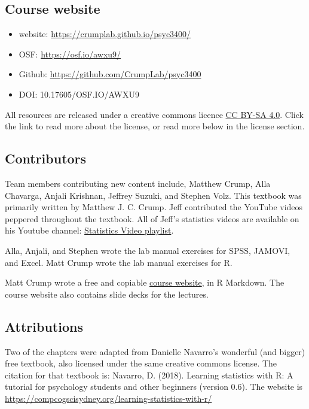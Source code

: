 \documentclass[]{book}
\providecommand{\tightlist}{%
  \setlength{\itemsep}{0pt}\setlength{\parskip}{0pt}}
\begin{document}
\hypertarget{course-website}{%
\subsection{Course website}\label{course-website}}

\begin{itemize}
\tightlist
\item
  website: \url{https://crumplab.github.io/psyc3400/}
\item
  OSF: \url{https://osf.io/awxu9/}
\item
  Github: \url{https://github.com/CrumpLab/psyc3400}
\item
  DOI: 10.17605/OSF.IO/AWXU9
\end{itemize}

All resources are released under a creative commons licence \href{https://creativecommons.org/licenses/by-sa/4.0/}{CC BY-SA 4.0}. Click the link to read more about the license, or read more below in the license section.

\hypertarget{contributors}{%
\subsection{Contributors}\label{contributors}}

Team members contributing new content include, Matthew Crump, Alla Chavarga, Anjali Krishnan, Jeffrey Suzuki, and Stephen Volz. This textbook was primarily written by Matthew J. C. Crump. Jeff contributed the YouTube videos peppered throughout the textbook. All of Jeff's statistics videos are available on his Youtube channel: \href{https://www.youtube.com/playlist?list=PLKXdxQAT3tCvuex_E1ZnQYaw897ELUSaI}{Statistics Video playlist}.

Alla, Anjali, and Stephen wrote the lab manual exercises for SPSS, JAMOVI, and Excel. Matt Crump wrote the lab manual exercises for R.

Matt Crump wrote a free and copiable \href{https://crumplab.github.io/psyc3400/}{course website}, in R Markdown. The course website also contains slide decks for the lectures.

\hypertarget{attributions}{%
\subsection{Attributions}\label{attributions}}

Two of the chapters were adapted from Danielle Navarro's wonderful (and bigger) free textbook, also licensed under the same creative commons license. The citation for that textbook is: Navarro, D. (2018). Learning statistics with R: A tutorial for psychology students and other beginners (version 0.6). The website is \url{https://compcogscisydney.org/learning-statistics-with-r/}
\end{document}
